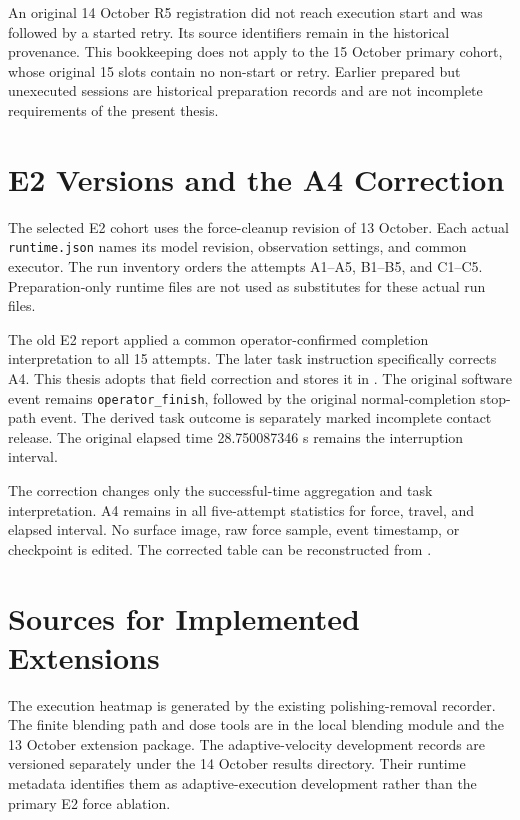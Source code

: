 
An original 14 October R5 registration did not reach execution start and was followed by a started retry. Its source identifiers remain in the historical provenance. This bookkeeping does not apply to the 15 October primary cohort, whose original 15 slots contain no non-start or retry. Earlier prepared but unexecuted sessions are historical preparation records and are not incomplete requirements of the present thesis.

\section{E2 Versions and the A4 Correction}
The selected E2 cohort uses the force-cleanup revision of 13 October. Each actual \texttt{runtime.json} names its model revision, observation settings, and common executor. The run inventory orders the attempts A1--A5, B1--B5, and C1--C5. Preparation-only runtime files are not used as substitutes for these actual run files.

The old E2 report applied a common operator-confirmed completion interpretation to all 15 attempts. The later task instruction specifically corrects A4. This thesis adopts that field correction and stores it in . The original software event remains \texttt{operator\_finish}, followed by the original normal-completion stop-path event. The derived task outcome is separately marked incomplete contact release. The original elapsed time 28.750087346 s remains the interruption interval.

The correction changes only the successful-time aggregation and task interpretation. A4 remains in all five-attempt statistics for force, travel, and elapsed interval. No surface image, raw force sample, event timestamp, or checkpoint is edited. The corrected table can be reconstructed from .

\section{Sources for Implemented Extensions}
The execution heatmap is generated by the existing polishing-removal recorder. The finite blending path and dose tools are in the local blending module and the 13 October extension package. The adaptive-velocity development records are versioned separately under the 14 October results directory. Their runtime metadata identifies them as adaptive-execution development rather than the primary E2 force ablation.

